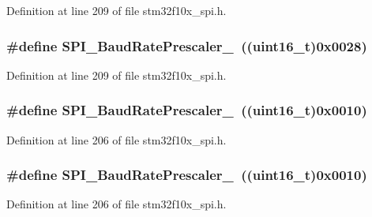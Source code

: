 Definition at line 209 of file stm32f10x\+\_\+spi.\+h.

\subsubsection[{\texorpdfstring{S\+P\+I\+\_\+\+Baud\+Rate\+Prescaler\+\_\+64}{SPI_BaudRatePrescaler_64}}]{\setlength{\rightskip}{0pt plus 5cm}\#define S\+P\+I\+\_\+\+Baud\+Rate\+Prescaler\+\_~(({\bf uint16\+\_\+t})0x0028)}\hypertarget{group___s_p_i___baud_rate___prescaler_ga2c9cd96ed56432a83f8e4f46fbecb5e6}{}\label{group___s_p_i___baud_rate___prescaler_ga2c9cd96ed56432a83f8e4f46fbecb5e6}


Definition at line 209 of file stm32f10x\+\_\+spi.\+h.

\subsubsection[{\texorpdfstring{S\+P\+I\+\_\+\+Baud\+Rate\+Prescaler\+\_\+8}{SPI_BaudRatePrescaler_8}}]{\setlength{\rightskip}{0pt plus 5cm}\#define S\+P\+I\+\_\+\+Baud\+Rate\+Prescaler\+\_~(({\bf uint16\+\_\+t})0x0010)}\hypertarget{group___s_p_i___baud_rate___prescaler_ga023a1e4c04586f2feb0d4b03b2e0c230}{}\label{group___s_p_i___baud_rate___prescaler_ga023a1e4c04586f2feb0d4b03b2e0c230}


Definition at line 206 of file stm32f10x\+\_\+spi.\+h.

\subsubsection[{\texorpdfstring{S\+P\+I\+\_\+\+Baud\+Rate\+Prescaler\+\_\+8}{SPI_BaudRatePrescaler_8}}]{\setlength{\rightskip}{0pt plus 5cm}\#define S\+P\+I\+\_\+\+Baud\+Rate\+Prescaler\+\_~(({\bf uint16\+\_\+t})0x0010)}\hypertarget{group___s_p_i___baud_rate___prescaler_ga023a1e4c04586f2feb0d4b03b2e0c230}{}\label{group___s_p_i___baud_rate___prescaler_ga023a1e4c04586f2feb0d4b03b2e0c230}


Definition at line 206 of file stm32f10x\+\_\+spi.\+h.

